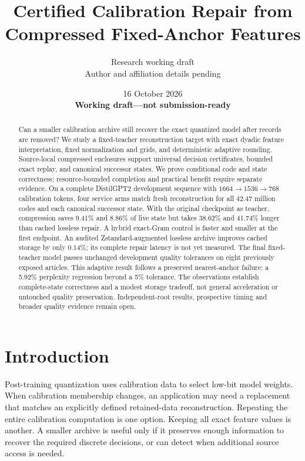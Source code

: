\documentclass[10pt,twocolumn,letterpaper]{article}
\title{Certified Calibration Repair from Compressed Fixed-Anchor Features}
\author{Research working draft\\Author and affiliation details pending}
\date{16 October 2026\\\textbf{Working draft---not submission-ready}}
\begin{document}
\maketitle

\begin{abstract}
Can a smaller calibration archive still recover the exact quantized model after
records are removed? We study a fixed-teacher reconstruction target with exact
dyadic feature interpretation, fixed normalization and grids, and deterministic
adaptive rounding. Source-local compressed enclosures support universal decision
certificates, bounded exact replay, and canonical successor states. We prove
conditional code and state correctness; resource-bounded completion and practical
benefit require separate evidence.
On a complete DistilGPT2 development sequence with
$1664\to1536\to768$ calibration tokens, four service arms match fresh
reconstruction for all 42.47 million codes and each canonical successor state.
With the original checkpoint as teacher, compression saves 9.41\% and 8.86\%
of live state but takes 38.62\% and 41.74\% longer than cached lossless repair.
A hybrid exact-Gram control is faster and smaller at the first endpoint.
An audited Zstandard-augmented lossless archive improves cached storage by only
0.14\%; its complete repair latency is not yet measured.
The final fixed-teacher model passes unchanged development quality tolerances
on eight previously exposed articles. This adaptive result follows a preserved
nearest-anchor failure: a 5.92\% perplexity regression beyond a 5\% tolerance.
The observations establish complete-state correctness and a modest storage
tradeoff, not general acceleration or untouched quality preservation.
Independent-root results, prospective timing and broader quality evidence remain
open.
\end{abstract}

\section{Introduction}
Post-training quantization uses calibration data to select low-bit model weights.
When calibration membership changes, an application may need a replacement that
matches an explicitly defined retained-data reconstruction. Repeating the entire
calibration computation is one option. Keeping all exact feature values is
another. A smaller archive is useful only if it preserves enough information to
recover the required discrete decisions, or can detect when additional source
access is needed.
\end{document}
